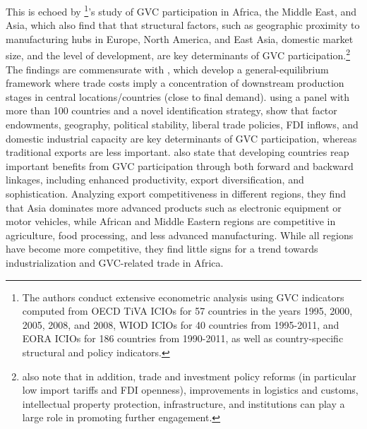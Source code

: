 \documentclass[a4paper]{article}
\begin{document}
This is echoed by \citet{kowalski2015participation}\footnote{The authors conduct extensive econometric analysis using GVC indicators computed from OECD TiVA ICIOs for 57 countries in the years 1995, 2000, 2005, 2008, and 2008, WIOD ICIOs for 40 countries from 1995-2011, and EORA ICIOs for 186 countries from 1990-2011, as well as country-specific structural and policy indicators.}'s study of GVC participation in Africa, the Middle East, and Asia, which also find that that structural factors, such as geographic proximity to manufacturing hubs in Europe, North America, and East Asia, domestic market size, and the level of development, are key determinants of GVC participation.\footnote{\citet{kowalski2015participation} also note that in addition, trade and investment policy reforms (in particular low import tariffs and FDI openness), improvements in logistics and customs, intellectual property protection, infrastructure, and institutions can play a large role in promoting further engagement.} The findings are commensurate with \citet{antras2020geography}, which develop a general-equilibrium framework where trade costs imply a concentration of downstream production stages in central locations/countries (close to final demand). \citet{fernandes2022determinants} using a panel with more than 100 countries and a novel identification strategy, show that factor endowments, geography, political stability, liberal trade policies, FDI inflows, and domestic industrial capacity are key determinants of GVC participation, whereas traditional exports are less important. 
\citet{kowalski2015participation} also state that developing countries reap important benefits from GVC participation through both forward and backward linkages, including enhanced productivity, export diversification, and sophistication. Analyzing export competitiveness in different regions, they find that Asia dominates more advanced products such as electronic equipment or motor vehicles, while African and Middle Eastern regions are competitive in agriculture, food processing, and less advanced manufacturing. While all regions have become more competitive, they find little signs for a trend towards industrialization and GVC-related trade in Africa. \newline %
\end{document}
